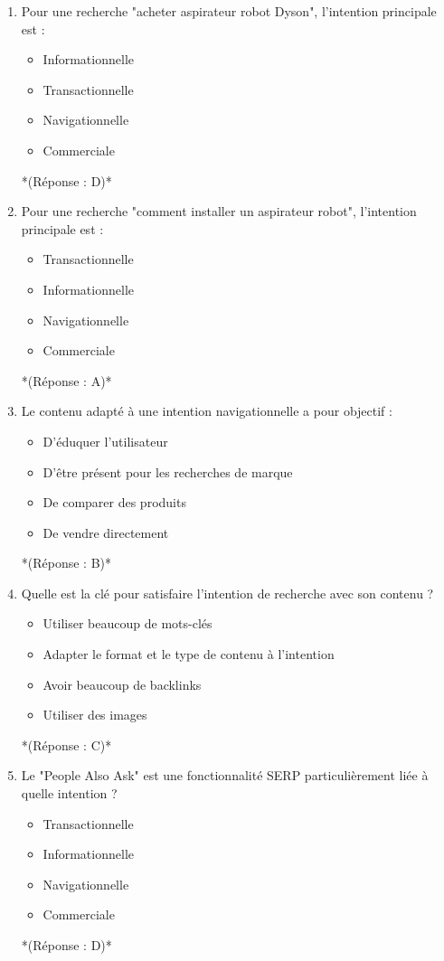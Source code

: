 \documentclass[12pt,a4paper,twoside]{report}
\begin{document}
\begin{enumerate}
\item Pour une recherche "acheter aspirateur robot Dyson", l'intention principale est :
\begin{itemize}
\item[A)] Informationnelle
\item[B)] Transactionnelle
\item[C)] Navigationnelle
\item[D)] Commerciale
\end{itemize}
*(Réponse : D)*

\item Pour une recherche "comment installer un aspirateur robot", l'intention principale est :
\begin{itemize}
\item[A)] Transactionnelle
\item[B)] Informationnelle
\item[C)] Navigationnelle
\item[D)] Commerciale
\end{itemize}
*(Réponse : A)*

\item Le contenu adapté à une intention navigationnelle a pour objectif :
\begin{itemize}
\item[A)] D'éduquer l'utilisateur
\item[B)] D'être présent pour les recherches de marque
\item[C)] De comparer des produits
\item[D)] De vendre directement
\end{itemize}
*(Réponse : B)*

\item Quelle est la clé pour satisfaire l'intention de recherche avec son contenu ?
\begin{itemize}
\item[A)] Utiliser beaucoup de mots-clés
\item[B)] Adapter le format et le type de contenu à l'intention
\item[C)] Avoir beaucoup de backlinks
\item[D)] Utiliser des images
\end{itemize}
*(Réponse : C)*

\item Le "People Also Ask" est une fonctionnalité SERP particulièrement liée à quelle intention ?
\begin{itemize}
\item[A)] Transactionnelle
\item[B)] Informationnelle
\item[C)] Navigationnelle
\item[D)] Commerciale
\end{itemize}
*(Réponse : D)*


\end{enumerate}
\end{document}
